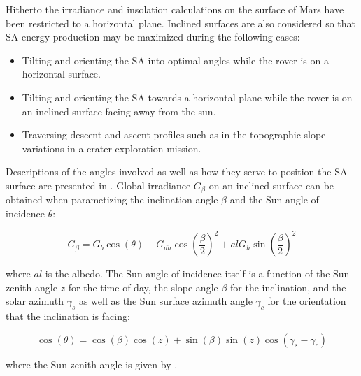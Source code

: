 Hitherto the irradiance and insolation calculations on the surface of Mars have been restricted to a horizontal plane. Inclined surfaces are also considered so that \ac{SA} energy production may be maximized during the following cases:
\begin{itemize}
    \item Tilting and orienting the \ac{SA} into optimal angles while the rover is on a horizontal surface.
    \item Tilting and orienting the \ac{SA} towards a horizontal plane while the rover is on an inclined surface facing away from the sun.
    \item Traversing descent and ascent profiles such as in the topographic slope variations in a crater exploration mission.
\end{itemize}

Descriptions of the angles involved as well as how they serve to position the \ac{SA} surface are presented in . Global irradiance $G_{\beta}$ on an inclined surface can be obtained when parametizing the inclination angle $\beta$ and the Sun angle of incidence $\theta$:

\begin{equation}
  \label{eq:G_beta}
  G_{\beta} = G_{b}\cos{(\theta)} + G_{dh}\cos{\left(\frac{\beta}{2}\right)}^2 + al G_{h} \sin{\left(\frac{\beta}{2}\right)}^2
\end{equation}

where $al$ is the albedo. The Sun angle of incidence itself is a function of the Sun zenith angle $z$ for the time of day, the slope angle $\beta$ for the inclination, and the solar azimuth $\gamma_{s}$ as well as the Sun surface azimuth angle $\gamma_{c}$ for the orientation that the inclination is facing:

\begin{equation}
  \label{eq:costheta}
  \cos{(\theta)} = \cos{(\beta)}\cos{(z)} + \sin{(\beta)}\sin{(z)}\cos{(\gamma_{s} - \gamma_{c})}
\end{equation}

where the Sun zenith angle is given by .


